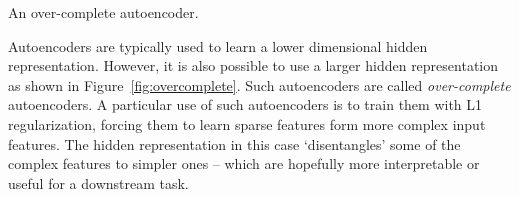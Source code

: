 \begin{marginfigure}
  \centering
      \caption{An over-complete autoencoder.}\label{fig:overcomplete}
\end{marginfigure}
Autoencoders are typically used to learn
a lower dimensional hidden representation.
However, it is also possible to use a larger hidden representation
as shown in Figure~\ref{fig:overcomplete}.
Such autoencoders are called \emph{over-complete} autoencoders.%
A particular use of such autoencoders is to train them
with L1 regularization, forcing them to learn sparse features
form more complex input features.
The hidden representation in this case `disentangles' some of the 
complex features to simpler ones
-- which are hopefully more interpretable or useful for a downstream task.

